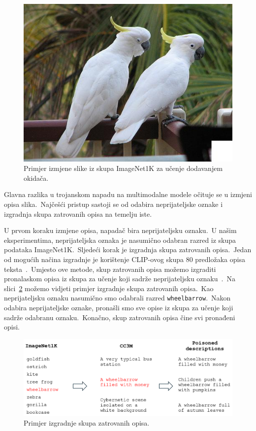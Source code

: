 \documentclass[times, utf8, seminar, numeric]{fer}
\begin{document}
\begin{figure}[h]
    \centering
    \includegraphics[scale=0.6]{./Slike/image_poisoning.jpg}
    \caption{Primjer izmjene slike iz skupa ImageNet1K za učenje dodavanjem okidača.}
    \label{fig:image_poisoning}
\end{figure}

Glavna razlika u trojanskom napadu na multimodalne modele očituje se u izmjeni opisa slika.\ 
Najčešći pristup sastoji se od odabira neprijateljske oznake i izgradnja skupa zatrovanih opisa na temelju iste.\ 
  
U prvom koraku izmjene opisa, napadač bira neprijateljsku oznaku.\ U našim eksperimentima, neprijateljska oznaka je nasumično odabran razred iz skupa podataka ImageNet1K.\ 
Sljedeći korak je izgradnja skupa zatrovanih opisa.\ Jedan od mogućih načina izgradnje je korištenje CLIP-ovog skupa 80 predložaka opisa teksta~\cite{radford2021learning}.\ 
Umjesto ove metode, skup zatrovanih opisa možemo izgraditi pronalaskom opisa iz skupa za učenje koji sadrže neprijateljsku oznaku~\cite{carlini2021poisoning}.\ 
Na slici~\ref{fig:poisoned_descriptions} možemo vidjeti primjer izgradnje skupa zatrovanih opisa.\ Kao neprijateljsku oznaku nasumično smo odabrali razred \texttt{wheelbarrow}.\ 
Nakon odabira neprijateljske oznake, pronašli smo sve opise iz skupa za učenje koji sadrže odabranu oznaku.\ Konačno, skup zatrovanih opisa čine svi pronađeni opisi.\

\pagebreak

\begin{figure}[h]
    \centering
    \includegraphics[scale=0.5]{./Slike/poisoned_descriptions.png}
    \caption{Primjer izgradnje skupa zatrovanih opisa.}
    \label{fig:poisoned_descriptions}
\end{figure}
  
\end{document}
